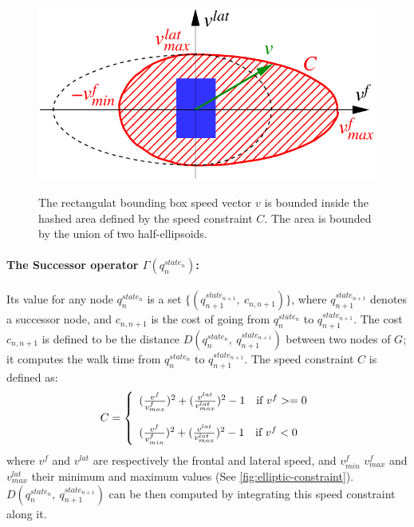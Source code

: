 \begin{figure}
  \centering
      {\includegraphics[width = \linewidth]{src/chap1-path-optimization/elliptic-constraint.pdf}}
      \caption{The rectangulat bounding box speed vector $v$ is bounded inside the
        hashed area defined by the speed constraint $C$. The area is
        bounded by the union of two half-ellipsoids.}
      \label{fig:elliptic-constraint}
\end{figure}

\paragraph{The Successor operator $\Gamma(q_n^{state_n})$:}
\noindent Its value for any node $q_n^{state_n}$ is a set
$\{(q_{n+1}^{state_{n+1}},~c_{n,n+1})\}$, where
$q_{n+1}^{state_{n+1}}$ denotes a successor node, and $c_{n,n+1}$ is
the cost of going from $q_n^{state_n}$ to $q_{n+1}^{state_{n+1}}$. The
cost $c_{n,n+1}$ is defined to be the distance
$D(q_n^{state_n},~q_{n+1}^{state_{n+1}})$ between two nodes of $G$; it
computes the walk time from $q_n^{state_n}$ to
$q_{n+1}^{state_{n+1}}$. The speed constraint $C$ is defined as:
\begin{equation}
C = \left\{
\begin{array}{l l l}
  (\frac{v^{f}}{v_{max}^{f}})^2 +
  (\frac{v^{lat}}{v_{max}^{lat}})^2 - 1
  \quad \text{if } v^f >= 0 \\

  \\

  (\frac{v^{f}}{v_{min}^{f}})^2 +
  (\frac{v^{lat}}{v_{max}^{lat}})^2 - 1
  \quad \text{if } v^f < 0
\end{array} \right.
\end{equation}
where $v^{f}$ and $v^{lat}$ are respectively the frontal and lateral
speed, and $v_{min}^f$ $v_{max}^{f}$ and $v_{max}^{lat}$ their minimum
and maximum values (See
\autoref{fig:elliptic-constraint}).$D(q_n^{state_n},~q_{n+1}^{state_{n+1}})$
can be then computed by integrating this speed constraint along it.

